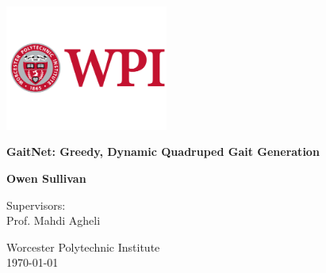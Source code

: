 \documentclass{report}
\begin{document}
\begin{titlepage}
  \centering
  \vspace*{1cm}

  \includegraphics[width=0.4\textwidth]{images/wpi-logo.png}\par\vspace{1cm}

  \Huge
  \textbf{GaitNet: Greedy, Dynamic Quadruped Gait Generation}

  \vspace{0.5cm}
  \LARGE

  \vspace{1.5cm}

  \textbf{Owen Sullivan}

  \vfill

  \Large
  Supervisors: \\
  Prof. Mahdi Agheli

  \vspace{0.8cm}

  \Large
  Worcester Polytechnic Institute \\
  {\small \today}

\end{titlepage}

\newpage
{}
\setcounter{page}{1}

\newpage
\tableofcontents
\newpage
\listoffigures
\newpage
\listoftables
\newpage

\newpage


\newpage
\setcounter{page}{1}

\newpage


\newpage


\newpage


\newpage


\newpage



\renewcommand{\bibname}{References}



\newpage

\end{document}

